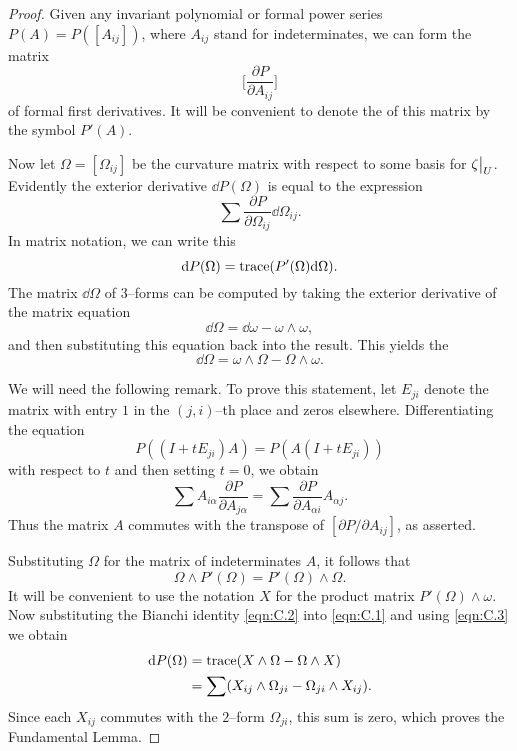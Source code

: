 \documentclass[../main]{subfiles}
\begin{document}
\begin{proof}
Given any invariant polynomial or formal power series $P(A) = P([A_{ij}])$, where $A_{ij}$ stand for indeterminates, we can form the matrix \[\bigg[\dfrac{\partial P}{\partial A_{ij}}\bigg]\] of formal first derivatives. It will be convenient to denote the  of this matrix by the symbol $P'(A)$. 

Now let $\Omega = [\Omega_{ij}]$ be the curvature matrix with respect to some basis for $\zeta \big{|}_U$. Evidently the exterior derivative $\dd P(\Omega)$ is equal to the expression \[\sum \dfrac{\partial P}{\partial \Omega_{ij}} \dd \Omega_{ij}.\] In matrix notation, we can write this
\begin{equation}
\label{eqn:C.1}
\mathrm{d} P(\Omega) = \operatorname{trace}(P'(\Omega) \mathrm{d} \Omega).
\end{equation}
The matrix $\dd \Omega$ of $3$--forms can be computed by taking the exterior derivative of the matrix equation \[\dd \Omega = \dd  \omega - \omega \wedge \omega,\] and then substituting this equation back into the result. This yields the  
\begin{equation}
\label{eqn:C.2}
\dd \Omega = \omega \wedge \Omega - \Omega \wedge \omega.
\end{equation}

We will need the following remark.  To prove this statement, let $E_{ji}$ denote the matrix with entry $1$ in the $(j, i)$--th place and zeros elsewhere. Differentiating the equation \[P((I + t E_{ji})A) = P(A(I + t E_{ji}))\] with respect to $t$ and then setting $t = 0$, we obtain \[\sum A_{i \alpha} \dfrac{\partial P}{\partial A_{j \alpha}} = \sum \dfrac{\partial P}{\partial A_{\alpha i}} A_{\alpha j}.\] Thus the matrix $A$ commutes with the transpose of $[\partial P/\partial A_{ij}]$, as asserted. 

Substituting $\Omega$ for the matrix of indeterminates $A$, it follows that
\begin{equation}
\label{eqn:C.3}
\Omega \wedge P'(\Omega) = P'(\Omega) \wedge \Omega.
\end{equation}
It will be convenient to use the notation $X$ for the product matrix $P'(\Omega) \wedge \omega$. Now substituting the Bianchi identity \eqref{eqn:C.2} into \eqref{eqn:C.1} and using \eqref{eqn:C.3} we obtain 
\begin{align*}
\mathrm{d} P(\Omega) & = \operatorname{trace} (X \wedge \Omega - \Omega \wedge X) \\ & = \sum (X_{ij} \wedge \Omega_{ji} - \Omega_{ji} \wedge X_{ij}).
\end{align*}
Since each $X_{ij}$ commutes with the $2$--form $\Omega_{ji}$, this sum is zero, which proves the Fundamental Lemma. 
\end{proof}
\end{document}
